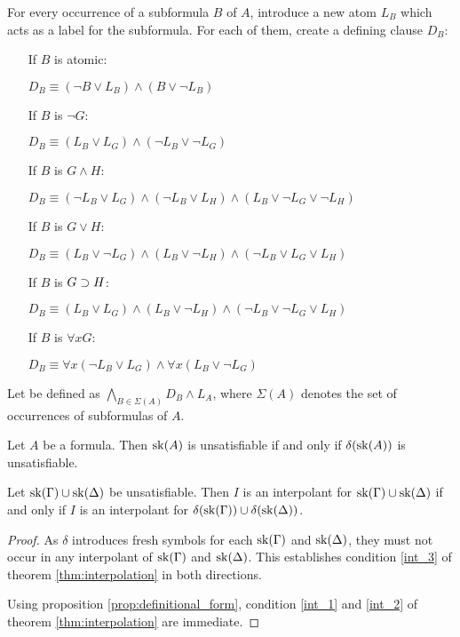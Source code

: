 \begin{defi}
For every occurrence of a subformula $B$ of $A$, introduce a new atom $L_B$ which acts as a label for the subformula. 
For each of them, create a defining clause $D_B$:

\begin{itemize}
	\item[If $B$ is atomic:]~

	$D_B\equiv (\lnot B \lor L_B) \land (B \lor \lnot L_B)  $
	\item[If $B$ is $\lnot G$:]~

	$D_B\equiv (L_B \lor L_G) \land (\lnot L_B \lor \lnot L_G)  $
	\item[If $B$ is $G \land H$:]~

		$D_B\equiv (\lnot L_B \lor L_G) \land (\lnot L_B \lor L_H) \land (L_B \lor \lnot L_G \lor \lnot L_H)  $
	\item[If $B$ is $G \lor H$:]~

		$D_B\equiv (L_B \lor \lnot L_G) \land (L_B \lor \lnot L_H) \land (\lnot L_B \lor L_G \lor L_H)  $
	\item[If $B$ is $G \supset H$:]~

		$D_B\equiv (L_B \lor L_G) \land (L_B \lor \lnot L_H) \land (\lnot L_B \lor \lnot L_G \lor L_H)  $
	\item[If $B$ is $\forall x G$:]~

		$D_B\equiv \forall x (\lnot L_B \lor L_G) \land \forall x(L_B \lor \lnot L_G)$
\end{itemize}

Let  be defined as $\bigwedge_{B \in \Sigma(A)} D_B \land L_A$, where $\Sigma(A)$ denotes the set of occurrences of subformulas of $A$.
\end{defi}

\begin{prop}
	\label{prop:definitional_form}
	Let $A$ be a formula. Then $\mathrm{sk}(A)$ is unsatisfiable if and only if $\delta(\mathrm{sk}(A))$ is unsatisfiable.
\end{prop}

\begin{prop}
	Let $\mathrm{sk}(\Gamma) \cup \mathrm{sk}(\Delta)$ be unsatisfiable.
	Then $I$ is an interpolant for \mbox{$\mathrm{sk}(\Gamma) \cup \mathrm{sk}(\Delta)$} if and only if 
	$I$ is an interpolant for $\delta(\mathrm{sk}(\Gamma)) \cup \delta(\mathrm{sk}(\Delta))$.
\end{prop}
\begin{proof}
	As $\delta$ introduces fresh symbols for each $\mathrm{sk}(\Gamma)$ and $\mathrm{sk}(\Delta)$, they must not occur in any interpolant of $\mathrm{sk}(\Gamma)$ and $\mathrm{sk}(\Delta)$. 
	This establishes condition \ref{int_3} of theorem \ref{thm:interpolation} in both directions.

Using proposition \ref{prop:definitional_form}, condition \ref{int_1} and \ref{int_2} of theorem \ref{thm:interpolation} are immediate.
\end{proof}

